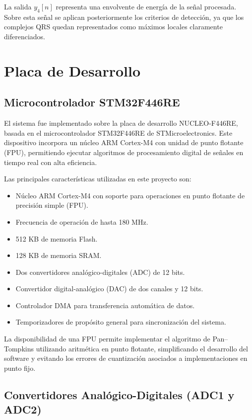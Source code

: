 \documentclass[12pt]{article}
\begin{document}
				La salida $y_4[n]$ representa una envolvente de energía de la señal procesada. Sobre esta señal se aplican posteriormente los criterios de detección, ya que los complejos QRS quedan representados como máximos locales claramente diferenciados.






	\section{Placa de Desarrollo}

		\subsection{Microcontrolador STM32F446RE} 

		El sistema fue implementado sobre la placa de desarrollo NUCLEO-F446RE, basada en el microcontrolador STM32F446RE de STMicroelectronics. Este dispositivo incorpora un núcleo ARM Cortex-M4 con unidad de punto flotante (FPU), permitiendo ejecutar algoritmos de procesamiento digital de señales en tiempo real con alta eficiencia.

		Las principales características utilizadas en este proyecto son:

		\begin{itemize}
			\item Núcleo ARM Cortex-M4 con soporte para operaciones en punto flotante de precisión simple (FPU).
			\item Frecuencia de operación de hasta 180 MHz.
			\item 512 KB de memoria Flash.
			\item 128 KB de memoria SRAM.
			\item Dos convertidores analógico-digitales (ADC) de 12 bits.
			\item Convertidor digital-analógico (DAC) de dos canales y 12 bits.
			\item Controlador DMA para transferencia automática de datos.
			\item Temporizadores de propósito general para sincronización del sistema.
		\end{itemize}

		La disponibilidad de una FPU permite implementar el algoritmo de Pan--Tompkins utilizando aritmética en punto flotante, simplificando el desarrollo del software y evitando los errores de cuantización asociados a implementaciones en punto fijo.

		\subsection{Convertidores Analógico-Digitales (ADC1 y ADC2)}
\end{document}
